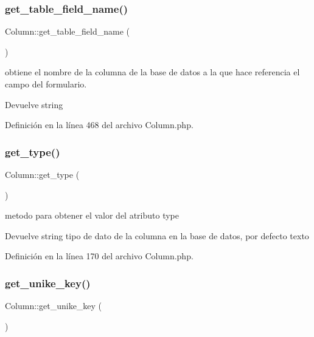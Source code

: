 \subsubsection{\texorpdfstring{get\_table\_field\_name()}{get\_table\_field\_name()}}
{\footnotesize\ttfamily Column\+::get\+\_\+table\+\_\+field\+\_\+name (\begin{DoxyParamCaption}{ }\end{DoxyParamCaption})}

obtiene el nombre de la columna de la base de datos a la que hace referencia el campo del formulario.

\begin{DoxyReturn}{Devuelve}
string 
\end{DoxyReturn}


Definición en la línea 468 del archivo Column.\+php.

\mbox{\label{class_column_ae0f1d35fdaae4ba874bba1f0a4db051b}} 
\subsubsection{\texorpdfstring{get\_type()}{get\_type()}}
{\footnotesize\ttfamily Column\+::get\+\_\+type (\begin{DoxyParamCaption}{ }\end{DoxyParamCaption})}

metodo para obtener el valor del atributo type

\begin{DoxyReturn}{Devuelve}
string tipo de dato de la columna en la base de datos, por defecto texto 
\end{DoxyReturn}


Definición en la línea 170 del archivo Column.\+php.

\mbox{\label{class_column_adc97cb771ea70684dcb2ff4591880418}} 
\subsubsection{\texorpdfstring{get\_unike\_key()}{get\_unike\_key()}}
{\footnotesize\ttfamily Column\+::get\+\_\+unike\+\_\+key (\begin{DoxyParamCaption}{ }\end{DoxyParamCaption})}

